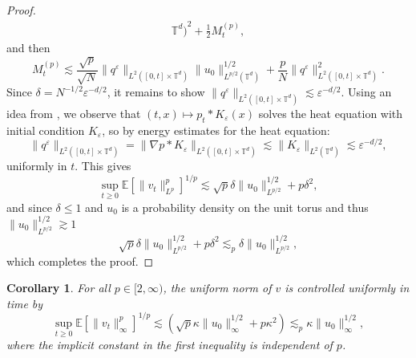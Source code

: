 \documentclass[a4paper,12pt]{article}
\newtheorem{corollary}[theorem]{Corollary}
\begin{document}
\begin{proof}
\begin{align*}
{    \mathbb{T}^d)}^2 + \frac{1}{2} M^{(p)}_t,
  \end{align*}
  and then
  \[ 
  M^{(p)}_t \lesssim \frac{\sqrt{p}}{\sqrt{N}} \| q^{\varepsilon} \|_{L^2
     ([0, t] \times \mathbb{T}^d)} \| u_0 \|_{L^{p / 2} (\mathbb{T}^d)}^{1 /
     2} + \frac{p}{N} \| q^{\varepsilon} \|_{L^2 ([0, t] \times
     \mathbb{T}^d)}^2 . 
  \]
  Since $\delta = N^{- 1 / 2} \varepsilon^{- d / 2}$, 
  it remains to show $\| q^{\varepsilon} \|_{L^2 ([0, t] \times \mathbb{T}^d)}
  \lesssim \varepsilon^{- d / 2}$.  Using an idea from \cite{Cornalba2023}, we observe that $(t,x)\mapsto p_t \ast K_{\varepsilon}(x)$ solves the heat
  equation with initial condition $K_{\varepsilon}$, so by energy estimates
  for the heat equation:
  \[ \| q^{\varepsilon} \|_{L^2 ([0, t] \times \mathbb{T}^d)} = \| \nabla p
     \ast K_{\varepsilon} \|_{L^2 ([0, t] \times \mathbb{T}^d)} \lesssim \|
     K_{\varepsilon} \|_{L^2 (\mathbb{T}^d)} \lesssim \varepsilon^{- d /
     2}, \]
   uniformly in $t$.
   This gives
   \[
   \sup_{t \geq 0}\mathbb{E}[\|v_t\|^p_{L^p}]^{1/p} \lesssim\sqrt{p}\delta \|u_0\|^{1/2}_{L^{p/2}}+p\delta^2,
   \]
   and since $\delta \leq 1$ and $u_0$ is a probability density on the unit torus and thus $\|u_0\|^{1/2}_{L^{p/2}} \gtrsim 1$
   \[
   \sqrt{p}\delta \|u_0\|^{1/2}_{L^{p/2}}+p\delta^2 \lesssim_p \delta \|u_0\|^{1/2}_{L^{p/2}},
   \]
   which completes the proof. 
\end{proof}


\begin{corollary}\label{cor:vunif}
  For all $p \in [2,\infty)$, the uniform norm of $v$ is controlled uniformly in time by
  \begin{equation}
    \sup_{t \geq 0} \mathbb{E} [\| v_t \|^p_{\infty}]^{1 / p} \lesssim \left(\sqrt{p}  \kappa \| u_0 \|_{\infty}^{1 /
    2} + p \kappa^2 \right) \lesssim_p \kappa \| u_0
     \|_{\infty}^{1 / 2}, \label{eq:moment-bound-uniform}
  \end{equation}
  where the implicit constant in the first inequality is independent of $p$.
\end{corollary}
\end{document}
